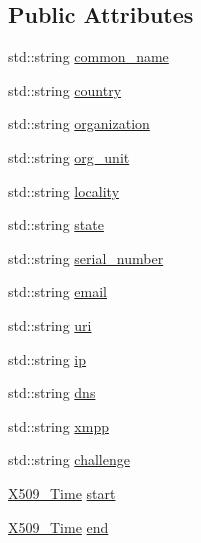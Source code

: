\subsection*{Public Attributes}
\begin{DoxyCompactItemize}
\item 
std\-::string \hyperlink{classBotan_1_1X509__Cert__Options_a02141950aee189043d3573f7ebe24d1f}{common\-\_\-name}
\item 
std\-::string \hyperlink{classBotan_1_1X509__Cert__Options_a5b033afb6618ae36bf0929cc1412a02a}{country}
\item 
std\-::string \hyperlink{classBotan_1_1X509__Cert__Options_a68d79dc286874071567bc750b60c0bc3}{organization}
\item 
std\-::string \hyperlink{classBotan_1_1X509__Cert__Options_a0cf6a8c6cb64d8ee6e42e7c6b887d19f}{org\-\_\-unit}
\item 
std\-::string \hyperlink{classBotan_1_1X509__Cert__Options_a8c7201a56c28890d2e57b084cb6a20d3}{locality}
\item 
std\-::string \hyperlink{classBotan_1_1X509__Cert__Options_a58e9e7fa566c43c4dcd0e437e5ec6ab8}{state}
\item 
std\-::string \hyperlink{classBotan_1_1X509__Cert__Options_a97e00dd64b29f47e79bb052e082d977d}{serial\-\_\-number}
\item 
std\-::string \hyperlink{classBotan_1_1X509__Cert__Options_a5e6c6b3e639a65adae61d87c213756b4}{email}
\item 
std\-::string \hyperlink{classBotan_1_1X509__Cert__Options_a1346083cee0959d8616cc28587c76fae}{uri}
\item 
std\-::string \hyperlink{classBotan_1_1X509__Cert__Options_a98bed02e619008fc99fa9080b6fede77}{ip}
\item 
std\-::string \hyperlink{classBotan_1_1X509__Cert__Options_a5f93a787b5f2bfc1a90952af1b675450}{dns}
\item 
std\-::string \hyperlink{classBotan_1_1X509__Cert__Options_a97fb3e69f481cd232d02f973fd542f83}{xmpp}
\item 
std\-::string \hyperlink{classBotan_1_1X509__Cert__Options_ad47945c06aa8d14b21404a22a0d8ed95}{challenge}
\item 
\hyperlink{classBotan_1_1X509__Time}{X509\-\_\-\-Time} \hyperlink{classBotan_1_1X509__Cert__Options_a6c733aff179893e7581a097d059fb733}{start}
\item 
\hyperlink{classBotan_1_1X509__Time}{X509\-\_\-\-Time} \hyperlink{classBotan_1_1X509__Cert__Options_a61812e17d190679ebb96649765f7a4ad}{end}
\item 

\end{DoxyCompactItemize}
